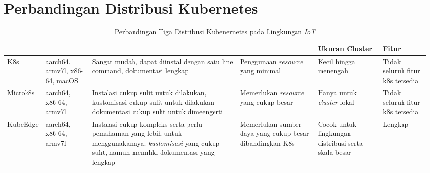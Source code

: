 \chapter{Perbandingan Distribusi Kubernetes}

\bgroup
\begin{table}[ht]
  \def\arraystretch{1.5}
  \caption{Perbandingan Tiga Distribusi Kubenernetes pada Lingkungan \textit{IoT}}
  \label{tab:perbandingan-distribusi-kubernetes}
  \centering
  \begin{tabular}{|p{1.7cm}|p{1.7cm}|p{2.3cm}|p{2cm}|p{1.5cm}|p{2cm}|}
    \hline
    \centering{Nama} & \centering{Dukungan arsitektur} & \centering{Instalasi dan Penggunaan}                                                                                                                           & \centering{Komputasi \textit{resource}}                  & Ukuran Cluster                                      & Fitur                            \\
    \hline
    K8s              & aarch64, armv7l, x86-64, macOS  & Sangat mudah, dapat diinstal dengan satu line command, dokumentasi lengkap                                                                                     & Penggunaan \textit{resource} yang minimal                & Kecil hingga menengah                               & Tidak seluruh fitur k8s tersedia \\
    \hline
    Microk8s         & aarch64, x86-64, armv7l         & Instalasi cukup sulit untuk dilakukan, kustomisasi cukup sulit untuk dilakukan, dokumentasi cukup sulit untuk dimeengerti                                      & Memerlukan \textit{resource} yang cukup besar            & Hanya untuk \textit{cluster} lokal                  & Tidak seluruh fitur k8s tersedia \\
    \hline
    KubeEdge         & aarch64, x86-64, armv7l         & Instalasi cukup kompleks serta perlu pemahaman yang lebih untuk menggunakannya. \textit{kustomisasi} yang cukup sulit, namun memiliki dokumentasi yang lengkap & Memerlukan sumber daya yang cukup besar dibandingkan K8s & Cocok untuk lingkungan distribusi serta skala besar & Lengkap                          \\
    \hline
  \end{tabular}
\end{table}
\egroup
